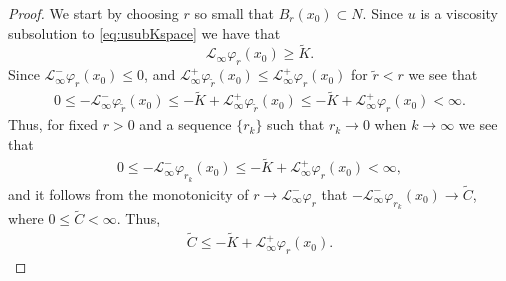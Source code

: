 \documentclass[11pt]{article}
\providecommand{\Linf}{\mathcal{L}_{\infty}}
\providecommand{\Lpos}{\mathcal{L}_{\infty}^+}
\providecommand{\Lneg}{\mathcal{L}_{\infty}^-}
\numberwithin{equation}{section}
\theoremstyle{definition}
\begin{document}
\begin{proof}
We start by choosing $r$ so small that $B_r(x_0) \subset N$. Since $u$ is a viscosity subsolution to \eqref{eq:usubKspace} we have that
\begin{equation}\label{eq:ineqstat}
    \Linf \varphi_r(x_0) \geq \tilde{K}.
\end{equation}   
Since $\Lneg \varphi_r(x_0) \leq 0$, and $\Lpos \varphi_{\tilde{r}}(x_0) \leq \Lpos \varphi_{r}(x_0)$ for $\tilde{r} < r$ we see that
\begin{align*}
    0 \leq -\Lneg \varphi_{\tilde{r}}(x_0) \leq -\tilde{K} + \Lpos \varphi_{\tilde{r}}(x_0) \leq -\tilde{K} + \Lpos \varphi_{r}(x_0)< \infty.
\end{align*}
 Thus, for fixed $r>0$ and a sequence $\{r_k\}$ such that $r_k \to 0$ when $k \to \infty$ we see that
 \begin{align*}
    0 \leq -\Lneg \varphi_{r_k}(x_0) \leq  -\tilde{K} + \Lpos \varphi_{r}(x_0)< \infty,
\end{align*}
 and it follows from the monotonicity of $r \to \Lneg \varphi_r$ that $-\Lneg \varphi_{r_k}(x_0) \to \tilde{C}$, where $0\leq \tilde{C} < \infty$. Thus,
  \begin{align}\label{eq:Dshortspace}
    \tilde{C} \leq   -\tilde{K} + \Lpos \varphi_{r}(x_0).
\end{align}
 

\end{proof}
\end{document}
